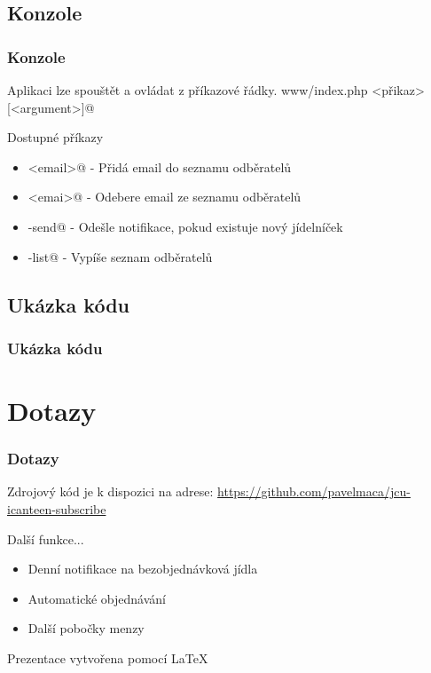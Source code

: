 \documentclass[slidestop]{beamer}
\begin{document}
\subsection{Konzole}
\begin{frame}[containsverbatim]
\frametitle{Konzole}
Aplikaci lze spouštět a ovládat z příkazové řádky.
\vfill
\verb@php www/index.php <přikaz> [<argument>]@
\vfill
\begin{block}{Dostupné příkazy}
  \begin{itemize}
    \item \verb@subscribe <email>@ - Přidá email do seznamu odběratelů
    \item \verb@unsubscribe  <emai>@ - Odebere email ze seznamu odběratelů
    \item \verb@notification-send@  - Odešle notifikace, pokud existuje nový jídelníček
    \item \verb@subscription-list@ - Vypíše seznam odběratelů
  \end{itemize}
\end{block}
\vfill
\end{frame}
\subsection{Ukázka kódu}
\begin{frame}[containsverbatim]
\frametitle{Ukázka kódu}
\begin{figure}[h] %
\begin{center}
\end{center}
\end{figure}
\end{frame}
\section{Dotazy}
\begin{frame}
\frametitle{Dotazy}
\vfill
Zdrojový kód je k dispozici na adrese:
\href{https://github.com/pavelmaca/jcu-icanteen-subscribe}{https://github.com/pavelmaca/jcu-icanteen-subscribe}

\begin{block}{Další funkce...}
  \begin{itemize}
  \item Denní notifikace na bezobjednávková jídla
  \item Automatické objednávání
  \item Další pobočky menzy
  \end{itemize}
\end{block}
\vfill
\tiny {Prezentace vytvořena pomocí \LaTeX}
\end{frame}
\end{document}
